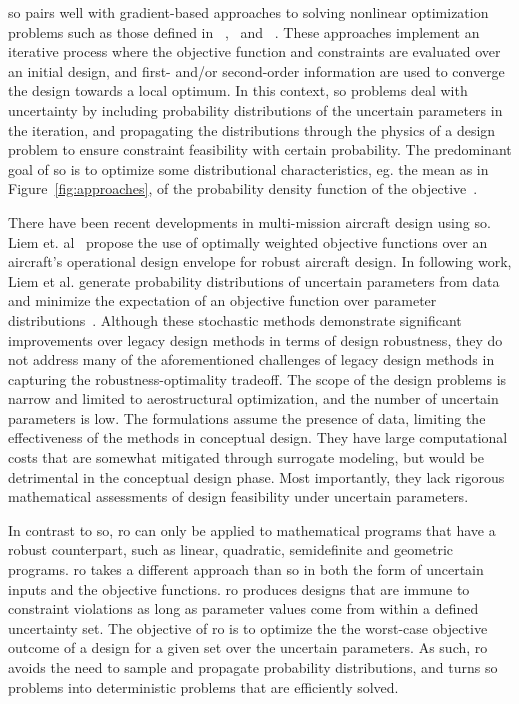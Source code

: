 {{\color{blue}\gls{so} pairs well with gradient-based approaches to solving nonlinear optimization problems
such as those defined in ~\cite{Gallard2013},~\cite{Liem2015} and ~\cite{Liem2017}.
These approaches implement an iterative process where
the objective function and constraints are evaluated over an initial design, and first- and/or
second-order information are used to converge the design towards a local optimum.
In this context, \gls{so} problems deal with uncertainty by including
probability distributions of the uncertain parameters in the iteration, and propagating
the distributions through the physics of a design problem to ensure constraint feasibility with certain probability.
The predominant goal of \gls{so} is to optimize some distributional
characteristics, eg. the mean as in Figure~\ref{fig:approaches},
of the probability density function of the objective~\cite{Diwekar2008}.}

{\color{blue}There have been recent developments in multi-mission aircraft design
using \gls{so}.
Liem et. al~\cite{Liem2015} propose the use of optimally
weighted objective functions over an aircraft's operational
design envelope for robust aircraft design.
In following work, Liem et al. generate probability distributions
of uncertain parameters from data
and minimize the expectation of an objective function over
parameter distributions~\cite{Liem2017}.
Although these stochastic methods demonstrate significant improvements over
legacy design methods in terms of design robustness,
they do not address many of the aforementioned challenges of legacy design methods
in capturing the robustness-optimality tradeoff.
The scope of the design problems is narrow and limited to aerostructural optimization,
and the number of uncertain parameters is low.
The formulations assume the presence of data, limiting the
effectiveness of the methods in conceptual design.
They have large computational costs that are somewhat mitigated through
surrogate modeling, but would be detrimental in the conceptual design phase.
Most importantly, they lack rigorous mathematical assessments of design feasibility
under uncertain parameters.}

In contrast to \gls{so},
\gls{ro} can only be applied to mathematical programs that have a robust counterpart,
such as linear, quadratic, semidefinite and geometric programs.
\gls{ro} takes a different approach than \gls{so} in both the form
of uncertain inputs and the objective functions. \gls{ro} produces designs that are
immune to constraint violations as long as parameter values come from within a defined
uncertainty set. The objective of \gls{ro} is to optimize the
the worst-case objective outcome of a design for a
given set over the uncertain parameters. As such,
\gls{ro} avoids the need to sample and propagate probability
distributions, and turns \gls{so} problems into
deterministic problems that are efficiently solved.}

